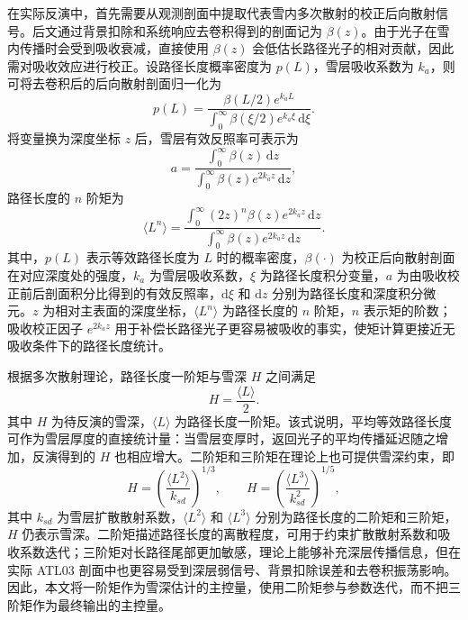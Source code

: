 在实际反演中，首先需要从观测剖面中提取代表雪内多次散射的校正后向散射信号。后文通过背景扣除和系统响应去卷积得到的剖面记为 \(\beta(z)\)。由于光子在雪内传播时会受到吸收衰减，直接使用 \(\beta(z)\) 会低估长路径光子的相对贡献，因此需对吸收效应进行校正。设路径长度概率密度为 \(p(L)\)，雪层吸收系数为 \(k_a\)，则可将去卷积后的后向散射剖面归一化为
\begin{equation}
    p(L)=\frac{\beta(L/2)e^{k_aL}}{\int_{0}^{\infty}\beta(\xi/2)e^{k_a\xi}\,\mathrm{d}\xi}.
\end{equation}
将变量换为深度坐标 \(z\) 后，雪层有效反照率可表示为
\begin{equation}
    a=\frac{\int_{0}^{\infty}\beta(z)\,\mathrm{d}z}{\int_{0}^{\infty}\beta(z)e^{2k_az}\,\mathrm{d}z},
\end{equation}
路径长度的 \(n\) 阶矩为
\begin{equation}
    \langle L^n\rangle =
    \frac{\int_{0}^{\infty}(2z)^n\beta(z)e^{2k_az}\,\mathrm{d}z}
    {\int_{0}^{\infty}\beta(z)e^{2k_az}\,\mathrm{d}z}.
\end{equation}
其中，\(p(L)\) 表示等效路径长度为 \(L\) 时的概率密度，\(\beta(\cdot)\) 为校正后向散射剖面在对应深度处的强度，\(k_a\) 为雪层吸收系数，\(\xi\) 为路径长度积分变量，\(a\) 为由吸收校正前后剖面积分比得到的有效反照率，\(\mathrm{d}\xi\) 和 \(\mathrm{d}z\) 分别为路径长度和深度积分微元。\(z\) 为相对主表面的深度坐标，\(\langle L^n\rangle\) 为路径长度的 \(n\) 阶矩，\(n\) 表示矩的阶数；吸收校正因子 \(e^{2k_az}\) 用于补偿长路径光子更容易被吸收的事实，使矩计算更接近无吸收条件下的路径长度统计。

根据多次散射理论，路径长度一阶矩与雪深 \(H\) 之间满足
\begin{equation}
    H=\frac{\langle L\rangle}{2}.
\end{equation}
其中 \(H\) 为待反演的雪深，\(\langle L\rangle\) 为路径长度一阶矩。该式说明，平均等效路径长度可作为雪层厚度的直接统计量：当雪层变厚时，返回光子的平均传播延迟随之增加，反演得到的 \(H\) 也相应增大。二阶矩和三阶矩在理论上也可提供雪深约束，即
\begin{equation}
    H=\left(\frac{\langle L^2\rangle}{k_{sd}}\right)^{1/3},
    \qquad
    H=\left(\frac{\langle L^3\rangle}{k_{sd}^2}\right)^{1/5},
\end{equation}
其中 \(k_{sd}\) 为雪层扩散散射系数，\(\langle L^2\rangle\) 和 \(\langle L^3\rangle\) 分别为路径长度的二阶矩和三阶矩，\(H\) 仍表示雪深。二阶矩描述路径长度的离散程度，可用于约束扩散散射系数和吸收系数迭代；三阶矩对长路径尾部更加敏感，理论上能够补充深层传播信息，但在实际 ATL03 剖面中也更容易受到深层弱信号、背景扣除误差和去卷积振荡影响。因此，本文将一阶矩作为雪深估计的主控量，使用二阶矩参与参数迭代，而不把三阶矩作为最终输出的主控量。

